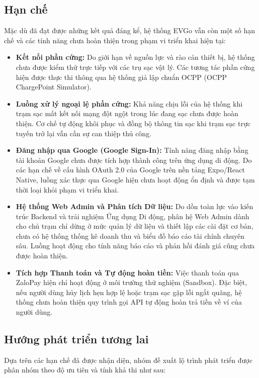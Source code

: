 \subsection{Hạn chế}
Mặc dù đã đạt được những kết quả đáng kể, hệ thống EVGo vẫn còn một số hạn chế và các tính năng chưa hoàn thiện trong phạm vi triển khai hiện tại:

\begin{itemize}
    \item \textbf{Kết nối phần cứng:} Do giới hạn về nguồn lực và rào cản thiết bị, hệ thống chưa được kiểm thử trực tiếp với các trụ sạc vật lý. Các tương tác phần cứng hiện được thực thi thông qua hệ thống giả lập chuẩn OCPP (OCPP ChargePoint Simulator).
    \item \textbf{Luồng xử lý ngoại lệ phần cứng:} Khả năng chịu lỗi của hệ thống khi trạm sạc mất kết nối mạng đột ngột trong lúc đang sạc chưa được hoàn thiện. Cơ chế tự động khôi phục và đồng bộ thông tin sạc khi trạm sạc trực tuyến trở lại vẫn cần sự can thiệp thủ công.
    \item \textbf{Đăng nhập qua Google (Google Sign-In):} Tính năng đăng nhập bằng tài khoản Google chưa được tích hợp thành công trên ứng dụng di động. Do các hạn chế về cấu hình OAuth 2.0 của Google trên nền tảng Expo/React Native, luồng xác thực qua Google hiện chưa hoạt động ổn định và được tạm thời loại khỏi phạm vi triển khai.
    \item \textbf{Hệ thống Web Admin và Phân tích Dữ liệu:} Do dồn toàn lực vào kiến trúc Backend và trải nghiệm Ứng dụng Di động, phân hệ Web Admin dành cho chủ trạm chỉ dừng ở mức quản lý dữ liệu và thiết lập các cài đặt cơ bản, chưa có hệ thống thống kê doanh thu và biểu đồ báo cáo tài chính chuyên sâu. Luồng hoạt động cho tính năng báo cáo và phản hồi đánh giá cũng chưa được hoàn thiện.
    \item \textbf{Tích hợp Thanh toán và Tự động hoàn tiền:} Việc thanh toán qua ZaloPay hiện chỉ hoạt động ở môi trường thử nghiệm (Sandbox). Đặc biệt, nếu người dùng hủy lịch hẹn hợp lệ hoặc trạm sạc gặp lỗi ngắt quãng, hệ thống chưa hoàn thiện quy trình gọi API tự động hoàn trả tiền về ví của người dùng.
\end{itemize}

\subsection{Hướng phát triển tương lai}
Dựa trên các hạn chế đã được nhận diện, nhóm đề xuất lộ trình phát triển được phân nhóm theo độ ưu tiên và tính khả thi như sau:

